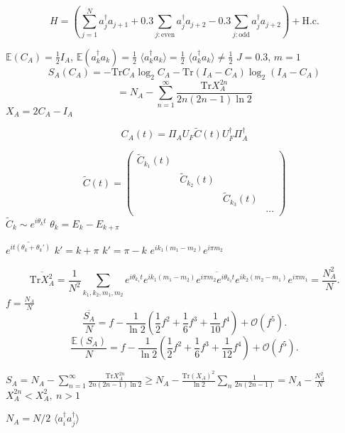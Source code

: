 \documentclass{beamer}
\begin{document}
\begin{frame}
      \[H=(\sum_{j=1}^{N}a_{j}^{\dagger}a_{j+1}+0.3\sum_{j:\mathrm{even}}a_{j}^{\dagger}a_{j+2}-0.3\sum_{j:\mathrm{odd}}a_{j}^{\dagger}a_{j+2})+\mathrm{H.c}.\]
\end{frame} 
\begin{frame}
   $\mathbb{E}(C_{A})=\frac{1}{2}I_{A}$, $\mathbb{E}(a_k^{\dagger}a_k)=\frac{1}{2}$
   $\langle a_k^{\dagger}a_k\rangle=\frac{1}{2}$
   $\langle a_k^{\dagger}a_k\rangle\neq\frac{1}{2}$
   $J=0.3$, $m=1$
   \[
      S_A(C_A)=-\mathrm{Tr}C_A\log_2{C_A}-\mathrm{Tr}(I_A-C_A)\log_2{(I_A-C_A)}
      \]
      \[
         =N_A-\sum_{n=1}^\infty \frac{\mathrm{Tr}X_A^{2n}}{2n(2n-1)\ln{2}}
         \]
         $X_A=2C_A-I_A$
\end{frame}
\begin{frame}
   \[   C_A(t)=\Pi_AU_F\tilde{C}(t)U_F^{\dagger}\Pi_A^{\dagger}\]
   
   \begin{equation*}
   \tilde{C}(t)=\begin{pmatrix}\tilde{C}_{k_{1}}(t)\\
 & \tilde{C}_{k_{2}}(t)\\
 &  & \tilde{C}_{k_{3}}(t)\\
 &  &  & \cdots
\end{pmatrix}
   \end{equation*}
$\tilde{C}_{k}\sim e^{i\theta_k t}$
$\theta_k=E_k-E_{k+\pi}$
\end{frame}
\begin{frame}
   $\overline{e^{it(\theta_k+\theta_k')}}$
   $k'=k+\pi$ $k'=\pi-k$
   $e^{ik_1(m_1-m_2)}e^{i\pi m_2}$
\end{frame}
\begin{frame}
   \[\overline{\mathrm{Tr} X_{A}^{2}}= \frac{1}{N^{2}}\sum_{k_{1},k_{2},m_{1},m_{2}}\overline{e^{i\theta_{k_{1}}t}e^{ik_{1}(m_{1}-m_{2})}e^{i\pi m_{2}}e^{i\theta_{k_{2}}t}e^{ik_{2}(m_{2}-m_{1})}e^{i\pi m_{1}}}
= \frac{N_{A}^{2}}{N}.\]
$f=\frac{N_A}{N}$
\begin{equation}
\frac{\overline{S_{A}}}{N}=f-\frac{1}{\ln{2}}\left(\frac{1}{2}f^{2}+\frac{1}{6}f^{3}+\frac{1}{10}f^{4}\right)+\mathcal{O}(f^{5}).\label{eq:the_Page_curve_for_NNH}
\end{equation}
\begin{equation}
\frac{\mathbb{E}(S_{A})}{N}=f-\frac{1}{\ln{2}}\left(\frac{1}{2}f^{2}+\frac{1}{6}f^{3}+\frac{1}{12}f^{4}\right)+\mathcal{O}(f^{5}).\label{eq:the_Page_curve_result_for_CCRFG}
\end{equation}
\end{frame}
\begin{frame}
   $S_{A}=N_A-\sum_{n=1}^\infty \frac{\mathrm{Tr}X_A^{2n}}{2n(2n-1)\ln{2}}\geq N_{A}-\frac{\mathrm{Tr}(X_{A})^{2}}{\ln2}\sum_{n}\frac{1}{2n(2n-1)}=N_{A}-\frac{N_{A}^{2}}{N}$
   $X_{A}^{2n}<X_A^2,\ n>1$
\end{frame}
\begin{frame}
$N_A=N/2$
$\langle a_i^{\dagger}a_j^{\dagger}\rangle$
\end{frame}
\end{document}
